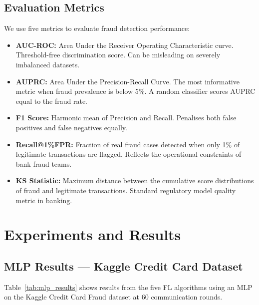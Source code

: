 \documentclass[12pt, a4paper]{article}
\begin{document}
\subsection{Evaluation Metrics}

We use five metrics to evaluate fraud detection performance:

\begin{itemize}[noitemsep]
\item \textbf{AUC-ROC:} Area Under the Receiver Operating Characteristic curve. Threshold-free discrimination score. Can be misleading on severely imbalanced datasets.
\item \textbf{AUPRC:} Area Under the Precision-Recall Curve. The most informative metric when fraud prevalence is below 5\%. A random classifier scores AUPRC equal to the fraud rate.
\item \textbf{F1 Score:} Harmonic mean of Precision and Recall. Penalises both false positives and false negatives equally.
\item \textbf{Recall@1\%FPR:} Fraction of real fraud cases detected when only 1\% of legitimate transactions are flagged. Reflects the operational constraints of bank fraud teams.
\item \textbf{KS Statistic:} Maximum distance between the cumulative score distributions of fraud and legitimate transactions. Standard regulatory model quality metric in banking.
\end{itemize}

\section{Experiments and Results}
\label{sec:results}

\subsection{MLP Results --- Kaggle Credit Card Dataset}

Table~\ref{tab:mlp_results} shows results from the five FL algorithms using an MLP on the Kaggle Credit Card Fraud dataset at 60 communication rounds.
\end{document}
